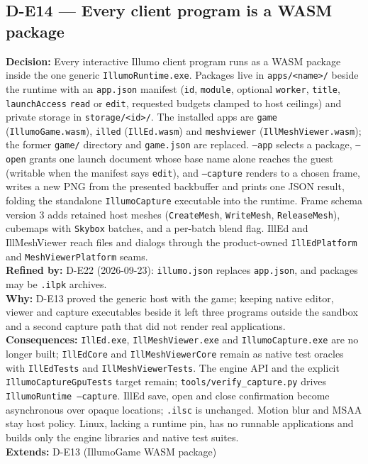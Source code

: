 \subsection*{D-E14 --- Every client program is a WASM package}
\begin{decisionbox}[title={D-E14 \quad 2026-09-22}]
\textbf{Decision:} Every interactive Illumo client program runs as a WASM
package inside the one generic \texttt{IllumoRuntime.exe}. Packages live in
\texttt{apps/<name>/} beside the runtime with an \texttt{app.json} manifest
(\texttt{id}, \texttt{module}, optional \texttt{worker}, \texttt{title},
\texttt{launchAccess} \texttt{read} or \texttt{edit}, requested budgets
clamped to host ceilings) and private storage in \texttt{storage/<id>/}. The
installed apps are \texttt{game} (\texttt{IllumoGame.wasm}), \texttt{illed}
(\texttt{IllEd.wasm}) and \texttt{meshviewer} (\texttt{IllMeshViewer.wasm});
the former \texttt{game/} directory and \texttt{game.json} are replaced.
\texttt{--app} selects a package, \texttt{--open} grants one launch document
whose base name alone reaches the guest (writable when the manifest says
\texttt{edit}), and \texttt{--capture} renders to a chosen frame, writes a new
PNG from the presented backbuffer and prints one JSON result, folding the
standalone \texttt{IllumoCapture} executable into the runtime. Frame schema
version 3 adds retained host meshes (\texttt{CreateMesh},
\texttt{WriteMesh}, \texttt{ReleaseMesh}), cubemaps with \texttt{Skybox}
batches, and a per-batch blend flag. IllEd and IllMeshViewer reach files and
dialogs through the product-owned \texttt{IllEdPlatform} and
\texttt{MeshViewerPlatform} seams.\\
\textbf{Refined by:} D-E22 (2026-09-23): \texttt{illumo.json} replaces
\texttt{app.json}, and packages may be \texttt{.ilpk} archives.\\
\textbf{Why:} D-E13 proved the generic host with the game; keeping native
editor, viewer and capture executables beside it left three programs outside
the sandbox and a second capture path that did not render real applications.\\
\textbf{Consequences:} \texttt{IllEd.exe}, \texttt{IllMeshViewer.exe} and
\texttt{IllumoCapture.exe} are no longer built; \texttt{IllEdCore} and
\texttt{IllMeshViewerCore} remain as native test oracles with
\texttt{IllEdTests} and \texttt{IllMeshViewerTests}. The engine
 API and the explicit \texttt{IllumoCaptureGpuTests}
target remain; \texttt{tools/verify\_capture.py} drives
\texttt{IllumoRuntime --capture}. IllEd save, open and close confirmation
become asynchronous over opaque locations; \texttt{.ilsc} is unchanged.
Motion blur and MSAA stay host policy. Linux, lacking a runtime pin, has no
runnable applications and builds only the engine libraries and native test
suites.\\
\textbf{Extends:} D-E13 (IllumoGame WASM package)
\end{decisionbox}

